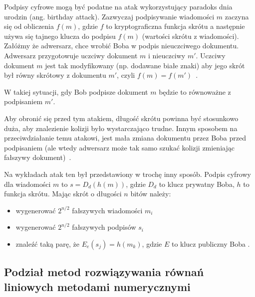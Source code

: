 \documentclass[wi]{zut}
\begin{document}
Podpisy cyfrowe mogą być podatne na atak wykorzystujący paradoks dnia urodzin (ang. birthday attack). Zazwyczaj podpisywanie wiadomości $m$ zaczyna się od obliczenia $f(m)$, gdzie $f$ to kryptograficzna funkcja skrótu a następnie używa się tajnego klucza do podpisu $f(m)$ (wartości skrótu z wiadomości). Załóżmy że adwersarz, chce wrobić Boba w podpis nieuczciwego dokumentu. Adwersarz przygotowuje uczciwy dokument $m$ i nieuczciwy $m'$. Uczciwy dokument $m$ jest tak modyfikowany (np. dodawane białe znaki) aby jego skrót był równy skrótowy z dokumentu $m'$, czyli $f(m) = f(m')$~\cite{wiki:Birthday_problem}.

W takiej sytuacji, gdy Bob podpisze dokument $m$ będzie to równoważne z podpisaniem $m'$.

Aby obronić się przed tym atakiem, długość skrótu powinna być stosunkowo duża, aby znalezienie kolizji było wystarczająco trudne. Innym sposobem na przeciwdziałanie temu atakowi, jest mała zmiana dokumentu przez Boba przed podpisaniem (ale wtedy adwersarz może tak samo szukać kolizji zmieniając fałszywy dokument)~\cite{wiki:Birthday_problem}.

Na wykładach atak ten był przedstawiony w trochę inny sposób. Podpis cyfrowy dla wiadomości $m$ to $s = D_d(h(m))$, gdzie $D_d$ to klucz prywatny Boba, $h$ to funkcja skrótu. Mając skrót o długości $n$ bitów należy:

\begin{itemize}
    \item wygenerować $2^{n/2}$ fałszywych wiadomości $m_i$
    \item wygenerować $2^{n/2}$ fałszywych podpisów $s_i$
    \item znaleźć taką parę, że $E_e(s_j) = h(m_k)$, gdzie $E$ to klucz publiczny Boba \cite{Chocian2020}.
\end{itemize}

\subsection{Podział metod rozwiązywania równań liniowych metodami numerycznymi}
\end{document}
